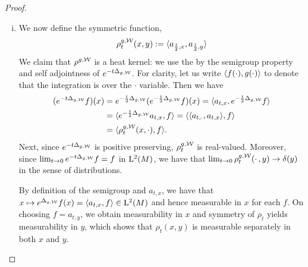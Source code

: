 \documentclass[a4paper, 12pt]{amsart}
\begin{document}
\begin{proof}
\begin{enumerate}[(i)]
\item We now define the symmetric function,
  $$\rho^{g,\mathcal{W}}_t(x,y) := \langle a_{\frac{t}{2}, x}, a_{\frac{t}{2}, y} \rangle$$
        We claim that \(\rho^{g,\mathcal{W}}\) is a heat kernel: we use the by the semigroup property and self adjointness of \(e^{-t\Delta_{g,\mathcal{W}}}\). For clarity, let us write \(\langle f(\cdot), g(\cdot) \rangle\) to denote that the integration is over the \(\cdot\) variable. Then we have
	\[
        \begin{split}
        (e^{-t \Delta_{g,\mathcal{W}}}f) (x) &= e^{-\frac{t}{2} \Delta_{g,\mathcal{W}}} (e^{-\frac{t}{2} \Delta_{g,\mathcal{W}}} f) (x) = \langle a_{t,x}, e^{-\frac{t}{2} \Delta_{g,\mathcal{W}}} f \rangle \\
        &= \langle e^{-\frac{t}{2} \Delta_{g,\mathcal{W}}} a_{t,x}, f \rangle = \langle \langle a_{t,\cdot}, a_{t,x} \rangle, f \rangle \\
        &= \langle \rho^{g,\mathcal{W}}_t(x,\cdot), f \rangle.
        \end{split}
        \]
        Next, since $e^{-t \Delta_{g,\mathcal{W}}}$	is positive preserving, $\rho_t^{g,\mathcal{W}}$ is real-valued. Moreover, since $\lim_{t\to 0} e^{-t\Delta_{g,\mathcal{W}}}f = f$ in ${\rm L}^{2}_{\rm {}}(M)$, we have that $\lim_{t \to 0} \rho^{g,\mathcal{W}}_t(\cdotp,y) \to  \delta(y)$ in the sense of distributions.

        By definition of the semigroup and $a_{t,x}$, we have that $x\mapsto e^{\Delta_{g,\mathcal{W}}}f(x) = \langle a_{t,x},f \rangle \in {\rm L}^{2}_{\rm {}}(M)$
	and hence measurable in $x$ for each $f$. 
	On choosing \(f = a_{t,y}\), we obtain 
	measurability in \(x\) and symmetry of \(\rho_t\) yields measurability in \(y\),
	which shows that \(\rho_t(x, y)\) is measurable separately in both \(x\) and \(y\). 


\end{enumerate}
\end{proof}
\end{document}
